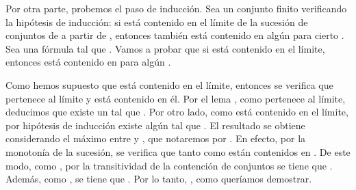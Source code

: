 \begin{isabellebody}
\begin{isamarkuptext}
\begin{demostracion}
  Por otra parte, probemos el paso de inducción. Sea  un conjunto finito verificando la 
  hipótesis de inducción: si  está contenido en el límite de la sucesión de conjuntos de 
   a partir de , entonces también está contenido en algún  para cierto . Sea 
   una fórmula tal que . Vamos a probar que si  está contenido en el límite, 
  entonces está contenido en  para algún . 

  Como hemos supuesto que  está contenido en el límite, entonces se verifica que 
  pertenece al límite y  está contenido en él. Por el lema , como  pertenece al 
  límite, deducimos que existe un  tal que . Por otro lado, como  está contenido
  en el límite, por hipótesis de inducción existe algún  tal que . El resultado 
  se obtiene considerando el máximo entre  y , que notaremos por . En efecto, por la 
  monotonía de la sucesión, se verifica que tanto  como  están contenidos en . De este 
  modo, como , por la transitividad de la contención de conjuntos se tiene que 
  . Además, como , se tiene que . Por lo tanto, , como 
  queríamos demostrar. 
\end{demostracion}


\end{isamarkuptext}
\end{isabellebody}

